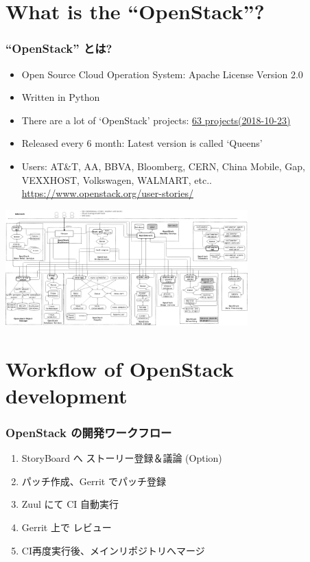 \documentclass[aspectratio=169,11pt,hyperref={colorlinks=true}]{beamer}
\begin{document}
\section{What is the ``OpenStack''?}
\begin{frame}
  \frametitle{``OpenStack'' とは?}
  \begin{itemize}
    \item Open Source Cloud Operation System: Apache License Version 2.0
    \item Written in Python
    \item There are a lot of `OpenStack' projects: \href{http://governance.openstack.org/reference/projects/index.html}{63 projects(2018-10-23)}
    \item Released every 6 month: Latest version is called `Queens'
    \item Users: \scriptsize{AT\&T, AA, BBVA, Bloomberg, CERN,
      China Mobile, Gap, VEXXHOST,
      Volkswagen, WALMART, etc.. \url{https://www.openstack.org/user-stories/}}
  \end{itemize}
  \begin{center}
    \includegraphics[width=0.7\textwidth]{openstack-arch-kilo-logical-v1.png}
  \end{center}
\end{frame}

\section{Workflow of OpenStack development}
\begin{frame}
  \frametitle{OpenStack の開発ワークフロー}
  \begin{enumerate}
    \item StoryBoard へ ストーリー登録＆議論 (Option)
    \item パッチ作成、Gerrit でパッチ登録
    \item Zuul にて CI 自動実行
    \item Gerrit 上で レビュー
    \item CI再度実行後、メインリポジトリへマージ
  \end{enumerate}
\end{frame}
\end{document}
